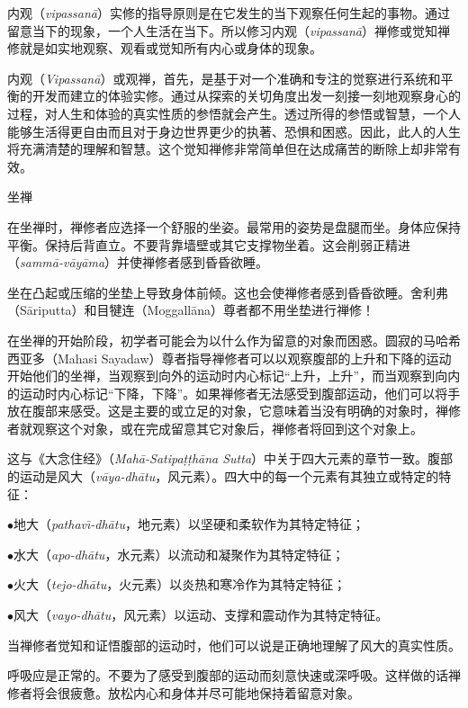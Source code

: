内观（{\it vipassan\=a}）实修的指导原则是在它发生的当下观察任何生起的事物。通过留意当下的现象，一个人生活在当下。所以修习内观（{\it vipassan\=a}）禅修或觉知禅修就是如实地观察、观看或觉知所有内心或身体的现象。

内观（{\it Vipassan\=a}）或观禅，首先，是\1基于对一个准确和专注的觉察进行系统和平衡的开发而建立的体验实修。通过从探索的关切角度出发一刻接一刻地观察身心的过程，对人生和体验的真实性质的参悟就会产生。透过所得的参悟或智慧，一个人能够生活得更自由而且对于身边世界更少的执著、恐惧和困惑。因此，此人的人生将充满清楚的理解和智慧。这个觉知禅修非常简单但在达成痛苦的断除上却非常有效。

\sssubsectnonib 坐禅

在坐禅时，禅修者应选择一个舒服的坐姿。最常用的姿势是盘腿而坐。身体应保持平衡。保持后背直立。不要背靠墙壁或其它支撑物坐着。这会削弱正精进（{\it samm\=a-v\=ay\=ama}）并使禅修者感到昏昏欲睡。

坐在凸起或压缩的坐垫上导致身体前倾。这也会使禅修者感到昏昏欲睡。舍利弗（S\=ariputta）和目犍连（Moggall\=ana）尊者都不用坐垫进行禅修！

在坐禅的开始阶段，初学者可能会为以什么作为留意的对象而困惑。圆寂的马哈希西亚多（Mahasi Sayadaw）尊者指导禅修者可以以观察腹部的上升和下降的运动开始他们的坐禅，当观察到向外的运动时内心标记“上升，上升”，而当观察到向内的运动时内心标记“下降，下降”。如果禅修者无法感受到腹部运动，他们可以将手放在腹部来感受。这是主要的或立足的对象，它意味着当没有明确的对象时，禅修者就观察\1这个对象，或在完成留意其它对象后，禅修者将回到这个对象上。

这与《大念住经》（{\it Mah\=a-Satipa\d t\d th\=ana Sutta}）中关于四大元素的章节一致。腹部的运动是风大（{\it v\=aya-dh\=atu}，风元素）。四大中的每一个元素有其独立或特定的特征：

{
\leftskip=1.6pc
\item{$\bullet$}地大（{\it pathav\=\i-dh\=atu}，地元素）以坚硬和柔软作为其特定特征；
\item{$\bullet$}水大（{\it apo-dh\=atu}，水元素）以流动和凝聚作为其特定特征；
\item{$\bullet$}火大（{\it tejo-dh\=atu}，火元素）以炎热和寒冷作为其特定特征；
\item{$\bullet$}风大（{\it vayo-dh\=atu}，风元素）以运动、支撑和震动作为其特定特征。

}

当禅修者觉知和证悟腹部的运动时，他们可以说是正确地理解了风大的真实性质。

呼吸应是正常的。不要为了感受到腹部的运动而刻意快速或深呼吸。这样做的话禅修者将会很疲惫。放松内心和身体并尽可能地保持着留意对象。

